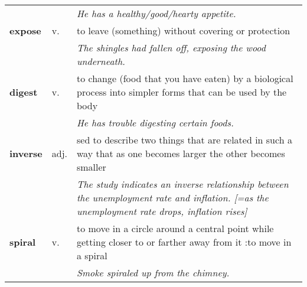 \documentclass[a4paper]{article}
\begin{document}
\begin{longtable}{llp{11cm}}
 & & \textit{He has a healthy/good/hearty appetite.}\\[0.08cm]
\textbf{expose} & v. &  to leave (something) without covering or protection \\
 & & \textit{The shingles had fallen off, exposing the wood underneath.}\\[0.08cm]
\textbf{digest} & v. &  to change (food that you have eaten) by a biological process into simpler forms that can be used by the body \\
 & & \textit{He has trouble digesting certain foods.}\\[0.08cm]
\textbf{inverse} & adj. &  sed to describe two things that are related in such a way that as one becomes larger the other becomes smaller \\
 & & \textit{The study indicates an inverse relationship between the unemployment rate and inflation. [=as the unemployment rate drops, inflation rises]}\\[0.08cm]
\textbf{spiral} & v. &  to move in a circle around a central point while getting closer to or farther away from it :to move in a spiral \\
 & & \textit{Smoke spiraled up from the chimney.}\\[0.08cm]
\end{longtable}
\end{document}
